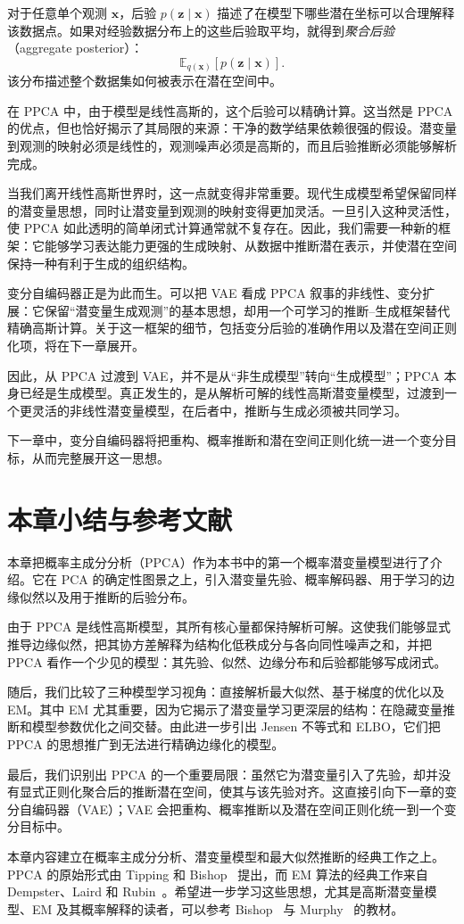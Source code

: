 对于任意单个观测 \(\mathbf{x}\)，后验 \(p(\mathbf{z}\mid\mathbf{x})\) 描述了在模型下哪些潜在坐标可以合理解释该数据点。如果对经验数据分布上的这些后验取平均，就得到\emph{聚合后验}（aggregate posterior）：
\[
\mathbb{E}_{q(\mathbf{x})}\!\left[p(\mathbf{z}\mid\mathbf{x})\right].
\]
该分布描述整个数据集如何被表示在潜在空间中。

在 PPCA 中，由于模型是线性高斯的，这个后验可以精确计算。这当然是 PPCA 的优点，但也恰好揭示了其局限的来源：干净的数学结果依赖很强的假设。潜变量到观测的映射必须是线性的，观测噪声必须是高斯的，而且后验推断必须能够解析完成。

当我们离开线性高斯世界时，这一点就变得非常重要。现代生成模型希望保留同样的潜变量思想，同时让潜变量到观测的映射变得更加灵活。一旦引入这种灵活性，使 PPCA 如此透明的简单闭式计算通常就不复存在。因此，我们需要一种新的框架：它能够学习表达能力更强的生成映射、从数据中推断潜在表示，并使潜在空间保持一种有利于生成的组织结构。

变分自编码器正是为此而生。可以把 VAE 看成 PPCA 叙事的非线性、变分扩展：它保留“潜变量生成观测”的基本思想，却用一个可学习的推断--生成框架替代精确高斯计算。关于这一框架的细节，包括变分后验的准确作用以及潜在空间正则化项，将在下一章展开。

因此，从 PPCA 过渡到 VAE，并不是从“非生成模型”转向“生成模型”；PPCA 本身已经是生成模型。真正发生的，是从解析可解的线性高斯潜变量模型，过渡到一个更灵活的非线性潜变量模型，在后者中，推断与生成必须被共同学习。

下一章中，变分自编码器将把重构、概率推断和潜在空间正则化统一进一个变分目标，从而完整展开这一思想。

\section*{本章小结与参考文献}

本章把概率主成分分析（PPCA）作为本书中的第一个概率潜变量模型进行了介绍。它在 PCA 的确定性图景之上，引入潜变量先验、概率解码器、用于学习的边缘似然以及用于推断的后验分布。

由于 PPCA 是线性高斯模型，其所有核心量都保持解析可解。这使我们能够显式推导边缘似然，把其协方差解释为结构化低秩成分与各向同性噪声之和，并把 PPCA 看作一个少见的模型：其先验、似然、边缘分布和后验都能够写成闭式。

随后，我们比较了三种模型学习视角：直接解析最大似然、基于梯度的优化以及 EM。其中 EM 尤其重要，因为它揭示了潜变量学习更深层的结构：在隐藏变量推断和模型参数优化之间交替。由此进一步引出 Jensen 不等式和 ELBO，它们把 PPCA 的思想推广到无法进行精确边缘化的模型。

最后，我们识别出 PPCA 的一个重要局限：虽然它为潜变量引入了先验，却并没有显式正则化聚合后的推断潜在空间，使其与该先验对齐。这直接引向下一章的变分自编码器（VAE）；VAE 会把重构、概率推断以及潜在空间正则化统一到一个变分目标中。

\bigskip

本章内容建立在概率主成分分析、潜变量模型和最大似然推断的经典工作之上。PPCA 的原始形式由 Tipping 和 Bishop~\cite{tipping1999ppca} 提出，而 EM 算法的经典工作来自 Dempster、Laird 和 Rubin~\cite{dempster1977em}。希望进一步学习这些思想，尤其是高斯潜变量模型、EM 及其概率解释的读者，可以参考 Bishop~\cite{bishop2006prml} 与 Murphy~\cite{murphy2012ml} 的教材。
